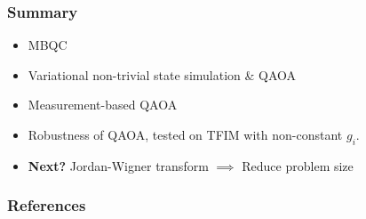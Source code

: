 \documentclass{beamer}
\theoremstyle{definition}
\begin{document}


\begin{frame}
\frametitle{Summary}


\begin{itemize}
	\item MBQC
	\item Variational non-trivial state simulation \& QAOA
	\item Measurement-based QAOA
	\item Robustness of QAOA, tested on TFIM with non-constant $g_i$.
	
	\pause
	
	\item \textbf{Next?} Jordan-Wigner transform $\implies$ Reduce problem size 
\end{itemize}


\end{frame}




\begin{frame}[allowframebreaks]
\frametitle{References}




{}



\end{frame}
\end{document}
